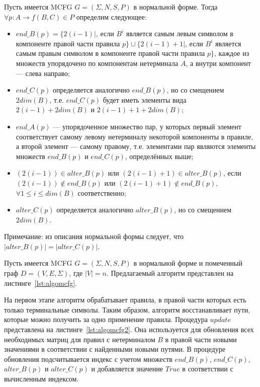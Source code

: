 \begin{definition}
	\label{def:sets-end-alter}
	Пусть имеется MCFG $G = (\Sigma, N, S, P)$ в нормальной форме. Тогда $\forall p: A \rightarrow f(B,C) \in P$ определим следующее:
	\begin{itemize}
		\item $end\_B(p) = \{2(i - 1)|$, если $B^i$ является самым левым символом в компоненте правой части правила $p\} \cup \{2(i - 1) + 1 |$, если $B^i$ является самым правым символом в компоненте правой части правила $p\}$, каждое из множеств упорядочено по компонентам нетерминала $A$, а внутри компонент --- слева направо;
		\item $end\_C(p)$ определяется аналогично $end\_B(p)$, но со смещением $2dim(B)$, т.е. $end\_C(p)$ будет иметь элементы вида $2(i - 1) + 2dim(B)$ и $2(i - 1) + 1 + 2dim(B)$;
		\item $end\_A(p)$ --- упорядоченное множество пар, у которых первый элемент соответствует самому левому нетерминалу некоторой компоненты в правиле, а второй элемент --- самому правому, т.е. элементами пар являются элементы множеств $end\_B(p)$ и $end\_C(p)$, определённых выше;
		\item $(2(i - 1)) \in alter\_B(p)$ или $(2(i - 1) + 1) \in alter\_B(p)$, если $(2(i - 1)) \notin end\_B(p)$ или $(2(i - 1) + 1) \notin end\_B(p)$, $\forall 1 \leq i \leq dim(B)$ соответственно;
		\item $alter\_C(p)$ определяется аналогично $alter\_B(p)$, но со смещением $2dim(B)$.
	\end{itemize}
\end{definition}

Примечание: из описания нормальной формы следует, что $|alter\_B(p)| = |alter\_C(p)|$.

Пусть имеется MCFG $G = (\Sigma, N, S, P)$ в нормальной форме и помеченный граф $D = (V, E, \Sigma)$, где $|V| = n$. Предлагаемый алгоритм представлен на листинге~\ref{lst:algomcfg}.

На первом этапе алгоритм обрабатывает правила, в правой части которых есть только терминальные символы. Таким образом, алгоритм восстанавливает пути, которые можно получить за одно применение правила. Процедура $update$ представлена на листинге~\ref{lst:algomcfg2}. Она используется для обновления всех необходимых матриц для правил с нетерминалом $B$ в правой части новыми значениями в соответствии с найденными новыми путями. В процедуре обновления подсчитывается индекс с учетом множеств $end\_B(p)$, $end\_C(p)$, $alter\_B(p)$ и $alter\_C(p)$ и добавляется значение $True$ в соответствии с вычисленным индексом.

